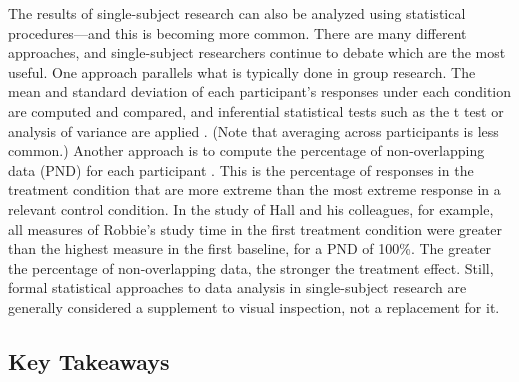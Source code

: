  The results of single-subject research can also be analyzed using statistical procedures---and this is becoming more common. There are many different approaches, and single-subject researchers continue to debate which are the most useful. One approach parallels what is typically done in group research. The mean and standard deviation of each participant's responses under each condition are computed and compared, and inferential statistical tests such as the t test or analysis of variance are applied \citep{fisch_evaluating_2001}. (Note that averaging across participants is less common.) Another approach is to compute the percentage of non-overlapping data (PND) for each participant \citep{scruggs_how_2001}. This is the percentage of responses in the treatment condition that are more extreme than the most extreme response in a relevant control condition. In the study of Hall and his colleagues, for example, all measures of Robbie's study time in the first treatment condition were greater than the highest measure in the first baseline, for a PND of 100\%. The greater the percentage of non-overlapping data, the stronger the treatment effect. Still, formal statistical approaches to data analysis in single-subject research are generally considered a supplement to visual inspection, not a replacement for it.


\subsection{Key Takeaways}

